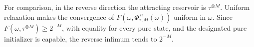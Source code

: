 For comparison, in the reverse direction the attracting reservoir is $\tau^{\otimes M}$. Uniform relaxation makes the convergence of $F(\omega,\Phi_{\tau,M}^{\,n}(\omega))$ uniform in $\omega$. Since $F(\omega,\tau^{\otimes M})\ge2^{-M}$, with equality for every pure state, and the designated pure initializer is capable, the reverse infimum tends to $2^{-M}$. 

